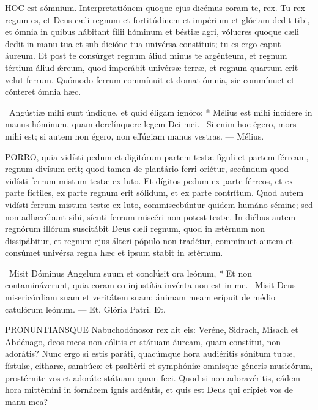 
\lettrine[lines=2]{H}{OC} est sómnium. Interpretatiónem quoque ejus dicémus coram te, rex. Tu rex regum es, et Deus cæli regnum et fortitúdinem et impérium et glóriam dedit tibi, et ómnia in quibus hábitant fílii hóminum et béstiæ agri, vólucres quoque cæli dedit in manu tua et sub dicióne tua univérsa constítuit; tu es ergo caput áureum. Et post te consúrget regnum áliud minus te argénteum, et regnum tértium áliud ǽreum, quod imperábit univérsæ terræ, et regnum quartum erit velut ferrum. Quómodo ferrum commínuit et domat ómnia, sic commínuet et cónteret ómnia hæc.

\R\ Angústiæ mihi sunt úndique, et quid éligam ignóro; * Mélius est mihi incídere in manus hóminum, quam derelínquere legem Dei mei. \V\ Si enim hoc égero, mors mihi est; si autem non égero, non effúgiam manus vestras. — Mélius.



\lettrine[lines=2]{P}{ORRO}, quia vidísti pedum et digitórum partem testæ fíguli et partem férream, regnum divísum erit; quod tamen de plantário ferri oriétur, secúndum quod vidísti ferrum mistum testæ ex luto. Et dígitos pedum ex parte férreos, et ex parte fíctiles, ex parte regnum erit sólidum, et ex parte contrítum. Quod autem vidísti ferrum mistum testæ ex luto, commiscebúntur quidem humáno sémine; sed non adhærébunt sibi, sícuti ferrum miscéri non potest testæ. In diébus autem regnórum illórum suscitábit Deus cæli regnum, quod in ætérnum non dissipábitur, et regnum ejus álteri pópulo non tradétur, commínuet autem et consúmet univérsa regna hæc et ipsum stabit in ætérnum.

\R\ Misit Dóminus Angelum suum et conclúsit ora leónum, * Et non contamináverunt, quia coram eo injustítia invénta non est in me. \V\ Misit Deus misericórdiam suam et veritátem suam: ánimam meam erípuit de médio catulórum leónum. — Et. Glória Patri. Et.




\lettrine[lines=2]{P}{RONUNTIANSQUE} Nabuchodónosor rex ait eis: Veréne, Sidrach, Misach et Abdénago, deos meos non cólitis et státuam áuream, quam constítui, non adorátis? Nunc ergo si estis paráti, quacúmque hora audiéritis sónitum tubæ, fístulæ, citharæ, sambúcæ et psaltérii et symphóniæ omnísque géneris musicórum, prostérnite vos et adoráte státuam quam feci. Quod si non adoravéritis, eádem hora mittémini in fornácem ignis ardéntis, et quis est Deus qui erípiet vos de manu mea?

